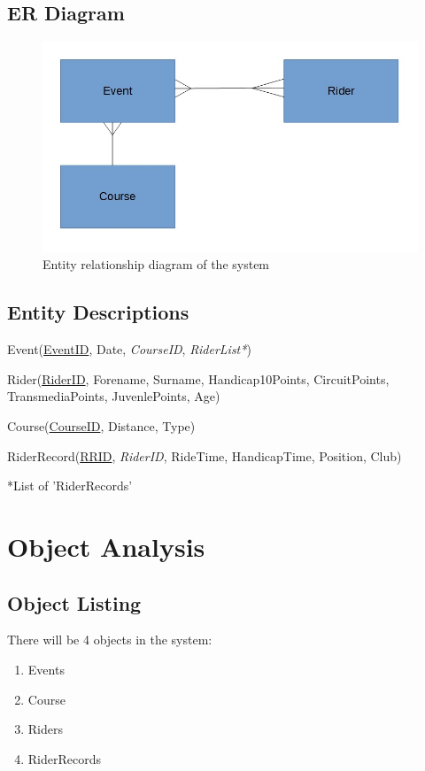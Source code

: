 \subsection{ER Diagram}

\begin{figure}[H]
	\includegraphics[width=\textwidth]{./ER.jpg}
	\caption{Entity relationship diagram of the system}
\end{figure}


\subsection{Entity Descriptions}
Event(\underline{EventID}, Date, \emph{CourseID}, \emph{RiderList*})

Rider(\underline{RiderID}, Forename, Surname, Handicap10Points, CircuitPoints, TransmediaPoints, JuvenlePoints, Age)

Course(\underline{CourseID}, Distance, Type)

RiderRecord(\underline{RRID}, \emph{RiderID}, RideTime, HandicapTime, Position, Club)

*List of 'RiderRecords'
\section{Object Analysis}

\subsection{Object Listing}
There will be 4 objects in the system:

\begin{enumerate}
    \item Events
    \item Course
    \item Riders
    \item RiderRecords
\end{enumerate}
